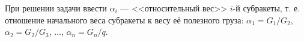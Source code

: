 При решении задачи ввести $\alpha _i$ --- <<относительный вес>> $i$-й субракеты,
т. е. отношение начального веса субракеты к весу её полезного груза:
$\alpha _1 = G_1/G_2$, $\alpha _2 = G_2/G_3$, $\dots$, $\alpha _n = G_n/q$.
